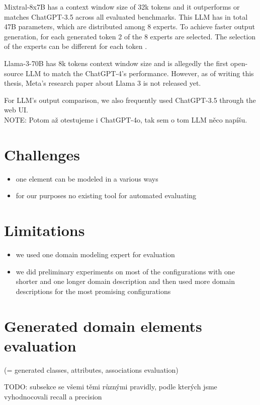 Mixtral-8x7B has a context window size of 32k tokens and it outperforms or matches ChatGPT-3.5 across all evaluated benchmarks. This LLM has in total 47B parameters, which are distributed among 8 experts. To achieve faster output generation, for each generated token 2 of the 8 experts are selected. The selection of the experts can be different for each token \cite{Jiang2024}.

Llama-3-70B has 8k tokens context window size and is allegedly  the first open-source LLM to match the ChatGPT-4's performance. However, as of writing this thesis, Meta's research paper about Llama 3 is not released yet.

For LLM's output comparison, we also frequently used ChatGPT-3.5 through the web UI. \\

NOTE: Potom až otestujeme i ChatGPT-4o, tak sem o tom LLM něco napíšu. \\


\section{Challenges}
\begin{itemize}
\item one element can be modeled in a various ways
\item for our purposes no existing tool for automated evaluating
\end{itemize}


\section{Limitations}
\begin{itemize}
\item we used one domain modeling expert for evaluation
\item we did preliminary experiments on most of the configurations with one shorter and one longer domain description and then used more domain descriptions for the most promising configurations
\end{itemize}


\section{Generated domain elements evaluation}
(= generated classes, attributes, associations evaluation)

TODO: subsekce se všemi těmi různými pravidly, podle kterých jsme vyhodnocovali recall a precision \\


